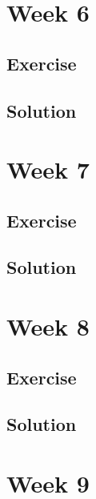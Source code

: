\documentclass[
]{book}
\begin{document}
\hypertarget{week-6-1}{%
\chapter{Week 6}\label{week-6-1}}

\hypertarget{exercise-2}{%
\section{Exercise}\label{exercise-2}}

\hypertarget{solution-3}{%
\section{Solution}\label{solution-3}}

\hypertarget{week-7}{%
\chapter{Week 7}\label{week-7}}

\hypertarget{exercise-3}{%
\section{Exercise}\label{exercise-3}}

\hypertarget{solution-4}{%
\section{Solution}\label{solution-4}}

\hypertarget{week-8}{%
\chapter{Week 8}\label{week-8}}

\hypertarget{exercise-4}{%
\section{Exercise}\label{exercise-4}}

\hypertarget{solution-5}{%
\section{Solution}\label{solution-5}}

\hypertarget{week-9}{%
\chapter{Week 9}\label{week-9}}
\end{document}
